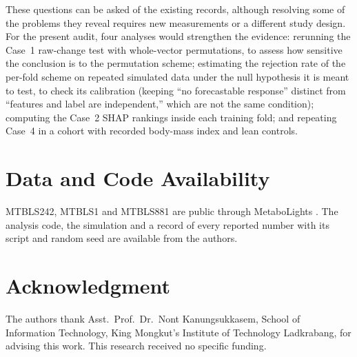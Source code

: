 \documentclass[conference]{IEEEtran}
\begin{document}
These questions can be asked of the existing records, although resolving
some of the problems they reveal requires new measurements or a different
study design. For the present audit, four analyses would strengthen the
evidence: rerunning the Case~1 raw-change test with whole-vector
permutations, to assess how sensitive the conclusion is to the permutation
scheme; estimating the rejection rate of the per-fold scheme on repeated
simulated data under the null hypothesis it is meant to test, to check its
calibration (keeping ``no forecastable response'' distinct from
``features and label are independent,'' which are not the same condition);
computing the Case~2 SHAP rankings inside each training fold; and repeating
Case~4 in a cohort with recorded body-mass index and lean controls.

\section*{Data and Code Availability}
MTBLS242, MTBLS1 and MTBLS881 are public through MetaboLights \cite{haug2020}.
The analysis code, the simulation and a record of every reported number with
its script and random seed are available from the authors.

\section*{Acknowledgment}
The authors thank Asst.\ Prof.\ Dr.\ Nont Kanungsukkasem, School of
Information Technology, King Mongkut's Institute of Technology Ladkrabang, for
advising this work. This research received no specific funding.
\end{document}
